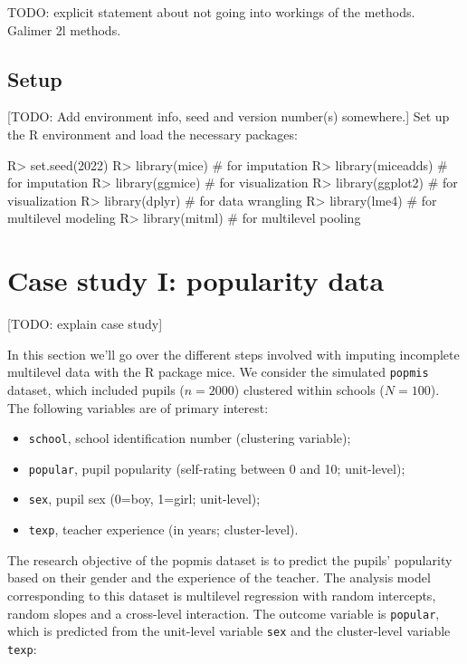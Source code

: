 \documentclass[
]{jss}
\providecommand{\tightlist}{%
  \setlength{\itemsep}{0pt}\setlength{\parskip}{0pt}}
\begin{document}
TODO: explicit statement about not going into workings of the methods.
Galimer 2l methods.

\hypertarget{setup}{%
\subsection{Setup}\label{setup}}

{[}TODO: Add environment info, seed and version number(s) somewhere.{]}
Set up the R environment and load the necessary packages:

\begin{CodeChunk}
\begin{CodeInput}
R> set.seed(2022)
R> library(mice)         # for imputation
R> library(miceadds)     # for imputation
R> library(ggmice)       # for visualization
R> library(ggplot2)      # for visualization
R> library(dplyr)        # for data wrangling
R> library(lme4)         # for multilevel modeling
R> library(mitml)        # for multilevel pooling
\end{CodeInput}
\end{CodeChunk}

\hypertarget{case-study-i-popularity-data}{%
\section{Case study I: popularity
data}\label{case-study-i-popularity-data}}

{[}TODO: explain case study{]}

In this section we'll go over the different steps involved with imputing
incomplete multilevel data with the R package mice. We consider the
simulated \texttt{popmis} dataset, which included pupils (\(n = 2000\))
clustered within schools (\(N = 100\)). The following variables are of
primary interest:

\begin{itemize}
\tightlist
\item
  \texttt{school}, school identification number (clustering variable);
\item
  \texttt{popular}, pupil popularity (self-rating between 0 and 10;
  unit-level);
\item
  \texttt{sex}, pupil sex (0=boy, 1=girl; unit-level);
\item
  \texttt{texp}, teacher experience (in years; cluster-level).
\end{itemize}

The research objective of the popmis dataset is to predict the pupils'
popularity based on their gender and the experience of the teacher. The
analysis model corresponding to this dataset is multilevel regression
with random intercepts, random slopes and a cross-level interaction. The
outcome variable is \texttt{popular}, which is predicted from the
unit-level variable \texttt{sex} and the cluster-level variable
\texttt{texp}:
\end{document}
